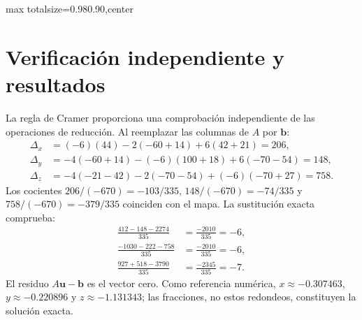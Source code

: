 \documentclass[spanish,letterpaper,oneside]{article}
\begin{document}
\begin{landscape}
\begin{center}
\begin{adjustbox}{max totalsize={0.98\linewidth}{0.90\textheight},center}
\end{adjustbox}
\end{center}
\end{landscape}

\section{Verificación independiente y resultados}
La regla de Cramer proporciona una comprobación independiente de las
operaciones de reducción. Al reemplazar las columnas de $A$ por $\mathbf b$:
\begin{align*}
\Delta_x&=(-6)(44)-2(-60+14)+6(42+21)=206,\\
\Delta_y&=-4(-60+14)-(-6)(100+18)+6(-70-54)=148,\\
\Delta_z&=-4(-21-42)-2(-70-54)+(-6)(-70+27)=758.
\end{align*}
Los cocientes $206/(-670)=-103/335$, $148/(-670)=-74/335$ y
$758/(-670)=-379/335$ coinciden con el mapa. La sustitución exacta comprueba:
\begin{align*}
\frac{412-148-2274}{335}&=\frac{-2010}{335}=-6,\\
\frac{-1030-222-758}{335}&=\frac{-2010}{335}=-6,\\
\frac{927+518-3790}{335}&=\frac{-2345}{335}=-7.
\end{align*}
El residuo $A\mathbf u-\mathbf b$ es el vector cero. Como referencia numérica,
$x\approx-0.307463$, $y\approx-0.220896$ y $z\approx-1.131343$;
las fracciones, no estos redondeos, constituyen la solución exacta.
\end{document}
